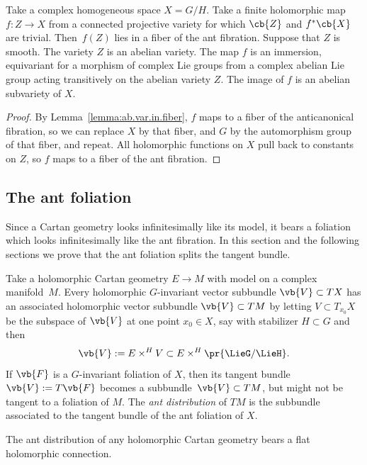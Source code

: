 \begin{Lemma}\label{lemma:ab.var.in.fiber.2}
Take a complex homogeneous space $X = G/H$.
Take a finite holomorphic map~${f \colon Z \to X}$ from a connected projective variety for which $\cb{Z}$ and $f^*\cb{X}$ are trivial.
Then~$f(Z)$ lies in a fiber of the ant fibration.
Suppose that $Z$ is smooth.
The variety $Z$ is an abelian variety.
The map $f$ is an immersion, equivariant for a morphism of complex Lie groups from a complex abelian Lie group acting transitively on the abelian variety $Z$.
The image of $f$ is an abelian subvariety of $X$.
\end{Lemma}

\begin{proof}
By Lemma~\ref{lemma:ab.var.in.fiber}, $f$ maps to a fiber of the anticanonical fibration, so we can replace $X$ by that fiber, and $G$ by the automorphism group of that fiber, and repeat.
All holomorphic functions on $X$ pull back to constants on $Z$, so $f$ maps to a fiber of the ant fibration.
\end{proof}

\subsection{The ant foliation}
Since a Cartan geometry looks infinitesimally like its model, it bears a foliation which looks infinitesimally like the ant fibration.
In this section and the following sections we prove that the ant foliation splits the tangent bundle.

Take a holomorphic Cartan geometry $E \to M$ with model  on a complex manifold~$M$.
Every holomorphic $G$-invariant vector subbundle $\vb{V} \subset TX$ has an associated
holomorphic vector subbundle $\vb{V} \subset TM$ by letting $V \subset T_{x_0} X$ be the
subspace of $\vb{V}$ at one point $x_0 \in X$, say with stabilizer $H \subset G$ and then
\[
\vb{V} := E \times^H V \subset E \times^H \pr{\LieG/\LieH}.
\]
If $\vb{F}$ is a $G$-invariant foliation of $X$, then its tangent bundle $\vb{V} := T\vb{F}$
becomes a subbundle~${\vb{V} \subset TM}$, but might not be tangent to a foliation of $M$.
The \emph{ant distribution} of $TM$ is the subbundle associated to the tangent bundle of the ant
foliation of $X$.

\begin{Lemma}
The ant distribution of any holomorphic Cartan geometry bears a flat holomorphic connection.
\end{Lemma}

